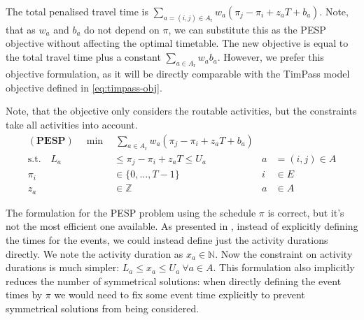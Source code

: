 \documentclass[english, 12pt, a4paper, sci, utf8, a-2b, online]{aaltothesis}
\newcommand{\N}{\mathbb{N}}
\newcommand{\Z}{\mathbb{Z}}
\newcommand{\Ar}{A_\text{r}}
\begin{document}
The total penalised travel time is $\sum_{a=(i,j) \in \Ar} w_a (\pi_j - \pi_i + z_aT + b_a)$. Note, that as $w_a$ and $b_a$ do not depend on $\pi$, we can substitute this as the PESP objective without affecting the optimal timetable. The new objective is equal to the total travel time plus a constant $\sum_{a \in \Ar}w_ab_a$. However, we prefer this objective formulation, as it will be directly comparable with the TimPass model objective defined in \cref{eq:timpass-obj}.


Note, that the objective only considers the routable activities, but the constraints take all activities into account.
\begin{align}
    \mathbf{(PESP)}\quad\min&\ \sum_{a \in \Ar} w_{a} (\pi_j-\pi_i+z_aT + b_a) \\
    \textrm{s.t.} \quad L_a &\leq \pi_j-\pi_i+z_aT  \leq U_a  &a &=(i,j)\in A \\
    \pi_i &\in \{0, \dots, T-1\} &i &\in E\\
    z_a &\in \Z &a &\in A
\end{align}



The formulation for the PESP problem using the schedule $\pi$ is correct, but it's not the most efficient one available. As presented in \cite{cycle-basis-original-2001}, instead of explicitly defining the times for the events, we could instead define just the activity durations directly. We note the activity duration as $x_a \in \N$. Now the constraint on activity durations is much simpler: $L_a \leq x_a \leq U_a\ \forall a \in A$. This formulation also implicitly reduces the number of symmetrical solutions: when directly defining the event times by $\pi$ we would need to fix some event time explicitly to prevent symmetrical solutions from being considered.
\end{document}
